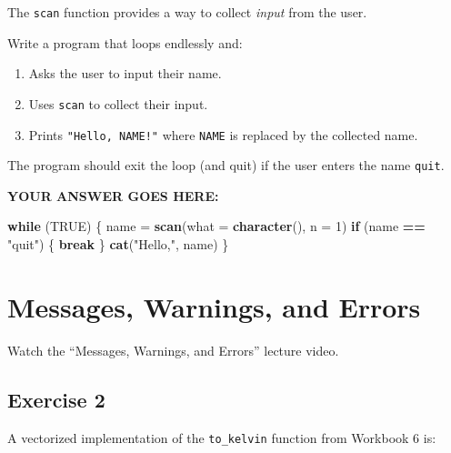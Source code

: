 \documentclass[
]{article}
\newenvironment{Shaded}{\begin{snugshade}}{\end{snugshade}}
\newcommand{\ControlFlowTok}[1]{\textcolor[rgb]{0.13,0.29,0.53}{\textbf{#1}}}
\newcommand{\DataTypeTok}[1]{\textcolor[rgb]{0.13,0.29,0.53}{#1}}
\newcommand{\DecValTok}[1]{\textcolor[rgb]{0.00,0.00,0.81}{#1}}
\newcommand{\KeywordTok}[1]{\textcolor[rgb]{0.13,0.29,0.53}{\textbf{#1}}}
\newcommand{\NormalTok}[1]{#1}
\newcommand{\OperatorTok}[1]{\textcolor[rgb]{0.81,0.36,0.00}{\textbf{#1}}}
\newcommand{\OtherTok}[1]{\textcolor[rgb]{0.56,0.35,0.01}{#1}}
\newcommand{\StringTok}[1]{\textcolor[rgb]{0.31,0.60,0.02}{#1}}
\providecommand{\tightlist}{%
  \setlength{\itemsep}{0pt}\setlength{\parskip}{0pt}}
\begin{document}
The \texttt{scan} function provides a way to collect \emph{input} from
the user.

Write a program that loops endlessly and:

\begin{enumerate}
\def\labelenumi{\arabic{enumi}.}
\tightlist
\item
  Asks the user to input their name.
\item
  Uses \texttt{scan} to collect their input.
\item
  Prints \texttt{"Hello,\ NAME!"} where \texttt{NAME} is replaced by the
  collected name.
\end{enumerate}

The program should exit the loop (and quit) if the user enters the name
\texttt{quit}.

\textbf{YOUR ANSWER GOES HERE:}

\begin{Shaded}
\begin{Highlighting}[]
\ControlFlowTok{while}\NormalTok{ (}\OtherTok{TRUE}\NormalTok{) \{}
\NormalTok{  name =}\StringTok{ }\KeywordTok{scan}\NormalTok{(}\DataTypeTok{what  =} \KeywordTok{character}\NormalTok{(), }\DataTypeTok{n =} \DecValTok{1}\NormalTok{)}
  \ControlFlowTok{if}\NormalTok{ (name }\OperatorTok{==}\StringTok{ "quit"}\NormalTok{) \{}
    \ControlFlowTok{break}
\NormalTok{  \}}
  \KeywordTok{cat}\NormalTok{(}\StringTok{"Hello,"}\NormalTok{, name)}
\NormalTok{\}}
\end{Highlighting}
\end{Shaded}

\hypertarget{messages-warnings-and-errors}{%
\section{Messages, Warnings, and
Errors}\label{messages-warnings-and-errors}}

Watch the ``Messages, Warnings, and Errors'' lecture video.

\hypertarget{exercise-2}{%
\subsection{Exercise 2}\label{exercise-2}}

A vectorized implementation of the \texttt{to\_kelvin} function from
Workbook 6 is:
\end{document}
